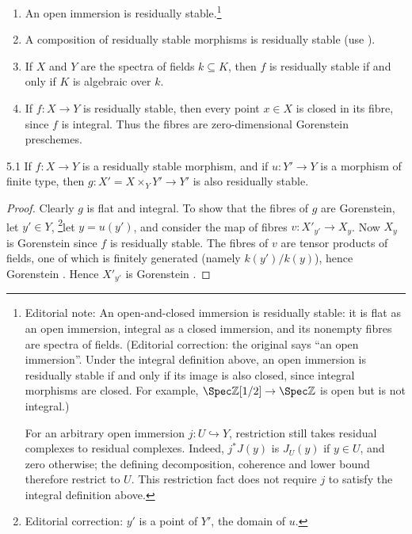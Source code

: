 \begin{example*}
\begin{enumerate}
\item An open immersion is residually stable.\footnote{Editorial note: An open-and-closed immersion is residually stable: it is flat as an open immersion, integral as a closed immersion, and its nonempty fibres are spectra of fields. (Editorial correction: the original says ``an open immersion''. Under the integral definition above, an open immersion is residually stable if and only if its image is also closed, since integral morphisms are closed. For example, $\Spec\mathbb Z[1/2]\to\Spec\mathbb Z$ is open but is not integral.)
\par For an arbitrary open immersion $j\colon U\hookrightarrow Y$, restriction still takes residual complexes to residual complexes. Indeed, $j^*J(y)$ is $J_U(y)$ if $y\in U$, and zero otherwise; the defining decomposition, coherence and lower bound therefore restrict to $U$. This restriction fact does not require $j$ to satisfy the integral definition above.}
\item A composition of residually stable morphisms is residually stable (use ).
\item If $X$ and $Y$ are the spectra of fields $k\subseteq K$, then $f$ is residually stable if and only if $K$ is algebraic over $k$.
\item If $f\colon X\to Y$ is residually stable, then every point $x\in X$ is closed in its fibre, since $f$ is integral. Thus the fibres are zero-dimensional Gorenstein preschemes.
\end{enumerate}
\end{example*}

\begin{bookproposition}{5.1}\label{prop:6.5.1}
If $f\colon X\to Y$ is a residually stable morphism, and if $u\colon Y'\to Y$ is a morphism of finite type, then $g\colon X' = X\times_Y Y'\to Y'$ is also residually stable.
\end{bookproposition}

\begin{proof}
Clearly $g$ is flat and integral. To show that the fibres of $g$ are Gorenstein, let $y'\in Y$, \footnote{Editorial correction: $y'$ is a point of $Y'$, the domain of $u$.}let $y = u(y')$, and consider the map of fibres $v\colon X'_{y'}\to X_{y}$. Now $X_{y}$ is Gorenstein since $f$ is residually stable. The fibres of $v$ are tensor products of fields, one of which is finitely generated (namely $k(y')/k(y)$), hence Gorenstein . Hence $X'_{y'}$ is Gorenstein .
\end{proof}

